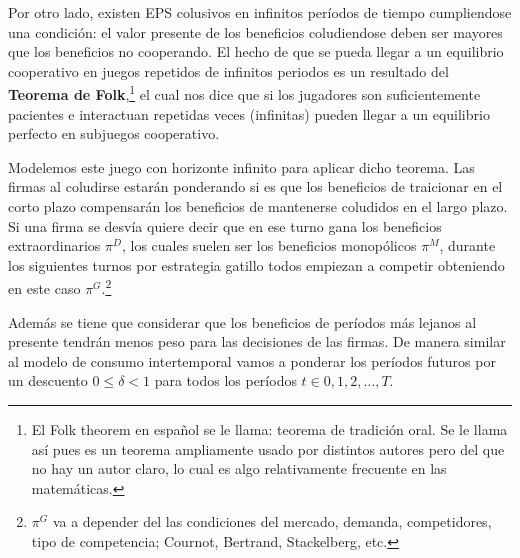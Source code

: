 Por otro lado, existen EPS colusivos en infinitos períodos de tiempo cumpliendose una condición: el valor presente de los beneficios coludiendose deben ser mayores que los beneficios no cooperando. El hecho de que se pueda llegar a un equilibrio cooperativo en juegos repetidos de infinitos periodos es un resultado del \textbf{Teorema de Folk},\footnote{El Folk theorem en español se le llama: teorema de tradición oral. Se le llama así pues es un teorema ampliamente usado por distintos autores pero del que no hay un autor claro, lo cual es algo relativamente frecuente en las matemáticas.} el cual nos dice que si los jugadores son suficientemente pacientes e interactuan repetidas veces (infinitas) pueden llegar a un equilibrio perfecto en subjuegos cooperativo.

Modelemos este juego con horizonte infinito para aplicar dicho teorema. Las firmas al coludirse estarán ponderando si es que los beneficios de traicionar en el corto plazo compensarán los beneficios de mantenerse coludidos en el largo plazo. Si una firma se desvía quiere decir que en ese turno gana los beneficios extraordinarios $\pi^D$, los cuales suelen ser los beneficios monopólicos $\pi^M$, durante los siguientes turnos por estrategia gatillo todos empiezan a competir obteniendo en este caso $\pi^G$.\footnote{$\pi^G$ va a depender del las condiciones del mercado, demanda, competidores, tipo de competencia; Cournot, Bertrand, Stackelberg, etc.}

Además se tiene que considerar que los beneficios de períodos más lejanos al presente tendrán menos peso para las decisiones de las firmas. De manera similar al modelo de consumo intertemporal vamos a ponderar los períodos futuros por un descuento $0 \leq \delta < 1$ para todos los períodos $t \in 0,1,2,\ldots,T$.

